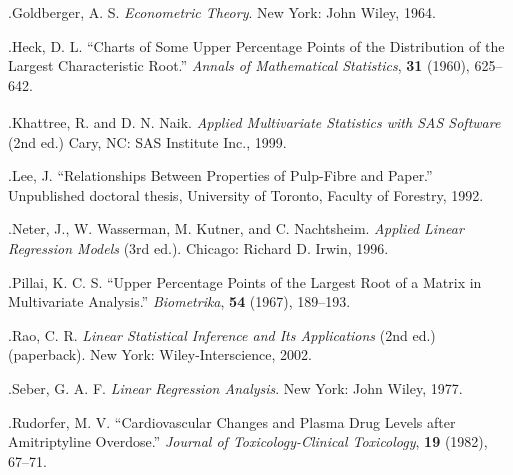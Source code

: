 .\quad Goldberger, A. S. \textit{Econometric Theory}. New York: John Wiley, 1964.

.\quad Heck, D. L. “Charts of Some Upper Percentage Points of the Distribution of the Largest Characteristic Root.” \textit{Annals of Mathematical Statistics}, \textbf{31} (1960), 625–642.

.\quad Khattree, R. and D. N. Naik. \textit{Applied Multivariate Statistics with SAS\textsuperscript{\textregistered} Software} (2nd ed.) Cary, NC: SAS Institute Inc., 1999.

.\quad Lee, J. “Relationships Between Properties of Pulp-Fibre and Paper.” Unpublished doctoral thesis, University of Toronto, Faculty of Forestry, 1992.

.\quad Neter, J., W. Wasserman, M. Kutner, and C. Nachtsheim. \textit{Applied Linear Regression Models} (3rd ed.). Chicago: Richard D. Irwin, 1996.

.\quad Pillai, K. C. S. “Upper Percentage Points of the Largest Root of a Matrix in Multivariate Analysis.” \textit{Biometrika}, \textbf{54} (1967), 189–193.

.\quad Rao, C. R. \textit{Linear Statistical Inference and Its Applications} (2nd ed.) (paperback). New York: Wiley-Interscience, 2002.

.\quad Seber, G. A. F. \textit{Linear Regression Analysis}. New York: John Wiley, 1977.

.\quad Rudorfer, M. V. “Cardiovascular Changes and Plasma Drug Levels after Amitriptyline Overdose.” \textit{Journal of Toxicology-Clinical Toxicology}, \textbf{19} (1982), 67–71.
